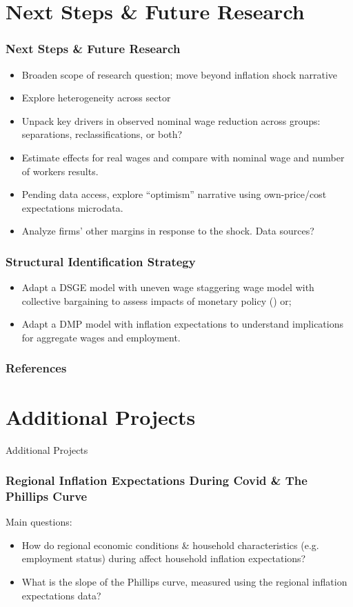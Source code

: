 \documentclass[aspectratio=169]{beamer}
\begin{document}
		\section{Next Steps \& Future Research}
		\begin{frame}
			\frametitle{Next Steps \& Future Research}
			\begin{itemize}
				\item Broaden scope of research question; move beyond inflation shock narrative
				\item Explore heterogeneity across sector
				\item Unpack key drivers in observed nominal wage reduction across groups: separations, reclassifications, or both? 
				\item Estimate effects for real wages and compare with nominal wage and number of workers results.
				\item Pending data access, explore ``optimism'' narrative using own-price/cost expectations microdata. 
				\item Analyze firms' other margins in response to the shock. Data sources?
			\end{itemize}
		\end{frame}
		\begin{frame}
		\frametitle{Structural Identification Strategy}
			\begin{itemize}
				\item Adapt a DSGE model with uneven wage staggering wage model with collective bargaining to assess impacts of monetary policy (\cite{oliveiTimingMonetaryPolicy2007}) or;
				\item Adapt a DMP model with inflation expectations to understand implications for aggregate wages and employment.
			\end{itemize}
		\end{frame}

		\begin{frame}
			\frametitle{References}
			\printbibliography
		\end{frame}

	\section{Additional Projects}
		\begin{frame}
			\centering
			\Huge{Additional Projects}
		\end{frame}

		\begin{frame}
			\frametitle{Regional Inflation Expectations During Covid \& The Phillips Curve}
			Main questions: 
			\begin{itemize}
				\item How do regional economic conditions \& household characteristics (e.g. employment status) during affect household inflation expectations?
				\item What is the slope of the Phillips curve, measured using the regional inflation expectations data?
			\end{itemize}
		\end{frame}
\end{document}
